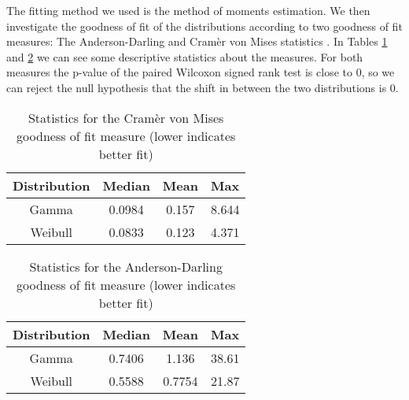 The fitting method we used is the method of moments estimation. %
We then 
investigate the goodness of fit of the distributions according to two goodness of fit measures:
The Anderson-Darling and Cram\`{e}r von Mises statistics \cite{citation, explain a little bit for the reviewer why they are important}. In Tables \ref{table:cvm} and 
\ref{table:ad} we can see some descriptive statistics about the measures. For both
measures the p-value of the paired Wilcoxon signed rank test is close to 0, so we can reject the
null hypothesis that the shift in between the two distributions is 0.



\begin{table}
	\begin{center}
		\begin{tabular}{|c|c|c|c|}
			\hline 
			Distribution & Median & Mean & Max \\ 
			\hline 
			Gamma & 0.0984 & 0.157 & 8.644 \\ 
			\hline 
			Weibull & 0.0833 & 0.123 & 4.371 \\ 
			\hline 
		\end{tabular} 
	\end{center}
	\caption{Statistics for the Cram\`{e}r von Mises goodness of fit measure (lower indicates better fit)}
	\label{table:cvm}
\end{table}


\begin{table}
	\begin{center}
		\begin{tabular}{|c|c|c|c|}
			\hline 
			Distribution & Median & Mean & Max \\ 
			\hline 
			Gamma & 0.7406 & 1.136 & 38.61 \\ 
			\hline 
			Weibull & 0.5588 & 0.7754 & 21.87 \\ 
			\hline 
		\end{tabular} 
	\end{center}
	\caption{Statistics for the Anderson-Darling goodness of fit measure (lower indicates better fit)}
	\label{table:ad}
\end{table}

